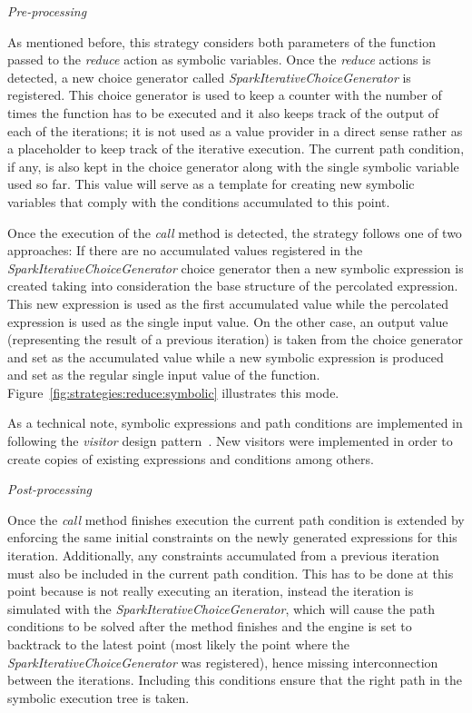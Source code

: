 \textit{Pre-processing}

As mentioned before, this strategy considers both parameters of the function passed to the \textit{reduce} action as symbolic variables. Once the \textit{reduce} actions is detected, a new choice generator called \textit{SparkIterativeChoiceGenerator} is registered. This choice generator is used to keep a counter with the number of times the function has to be executed and it also keeps track of the output of each of the iterations; it is not used as a value provider in a direct sense rather as a placeholder to keep track of the iterative execution. The current path condition, if any, is also kept in the choice generator along with the single symbolic variable used so far. This value will serve as a template for creating new symbolic variables that comply with the conditions accumulated to this point.

Once the execution of the \textit{call} method is detected, the strategy follows one of two approaches: If there are no accumulated values registered in the \textit{SparkIterativeChoiceGenerator} choice generator then a new symbolic expression is created taking into consideration the base structure of the percolated expression. This new expression is used as the first accumulated value while the percolated expression is used as the single input value. On the other case, an output value (representing the result of a previous iteration) is taken from the choice generator and set as the accumulated value while a new symbolic expression is produced and set as the regular single input value of the function. Figure~\ref{fig:strategies:reduce:symbolic} illustrates this mode.

As a technical note, symbolic expressions and path conditions are implemented in \spf{} following the \textit{visitor} design pattern~\cite{Gamma1994}. New visitors were implemented in order to create copies of existing expressions and conditions among others.

\textit{Post-processing}

Once the \textit{call} method finishes execution the current path condition is extended by enforcing the same initial constraints on the newly generated expressions for this iteration. Additionally, any constraints accumulated from a previous iteration must also be included in the current path condition. This has to be done at this point because \jpf{} is not really executing an iteration, instead the iteration is simulated with the \textit{SparkIterativeChoiceGenerator}, which will cause the path conditions to be solved after the method finishes and the engine is set to backtrack to the latest point (most likely the point where the \textit{SparkIterativeChoiceGenerator} was registered), hence missing interconnection between the iterations. Including this conditions ensure that the right path in the symbolic execution tree is taken.

